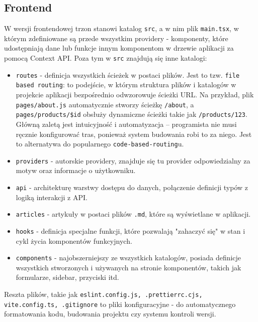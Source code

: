 \documentclass[shortabstract,inz]{iithesis}
\begin{document}
\subsection{Frontend}
W wersji frontendowej trzon stanowi katalog \texttt{src}, a w nim plik \texttt{main.tsx}, w którym zdefiniowane są przede wszystkim providery - komponenty, które udostępniają dane lub funkcje innym komponentom w drzewie aplikacji za pomocą Context API. Poza tym w \texttt{src} znajdują się inne katalogi:
\begin{itemize}
    \item \texttt{routes} - definicja wszystkich ścieżek w postaci plików. Jest to tzw. \texttt{file based routing}: to podejście, w którym struktura plików i katalogów w projekcie aplikacji bezpośrednio odwzorowuje ścieżki URL. Na przykład, plik \texttt{pages/about.js} automatycznie stworzy ścieżkę \texttt{/about}, a \texttt{pages/products/\$id} obsłuży dynamiczne ścieżki takie jak \texttt{/products/123}. Główną zaletą jest intuicyjność i automatyzacja – programista nie musi ręcznie konfigurować tras, ponieważ system budowania robi to za niego. Jest to alternatywa do popularnego \texttt{code-based-routing}u.

    \item \texttt{providers} - autorskie providery, znajduje się tu provider odpowiedzialny za motyw oraz informacje o użytkowniku.

    \item \texttt{api} - architekturę warstwy dostępu do danych, połączenie definicji typów z logiką interakcji z API.

    \item \texttt{articles} - artykuły w postaci plików \texttt{.md}, które są wyświetlane w aplikacji.

    \item \texttt{hooks} - definicja specjalne funkcji, które pozwalają "zahaczyć się" w stan i cykl życia komponentów funkcyjnych.

    \item \texttt{components} - najobszerniejszy ze wszystkich katalogów, posiada definicje wszystkich stworzonych i używanych na stronie komponentów, takich jak formularze, sidebar, przyciski itd.

\end{itemize}

Reszta plików, takie jak \texttt{eslint.config.js, .prettierrc.cjs, vite.config.ts, .gitignore} to pliki konfiguracyjne - do automatycznego formatowania kodu, budowania projektu czy systemu kontroli wersji.
\end{document}

